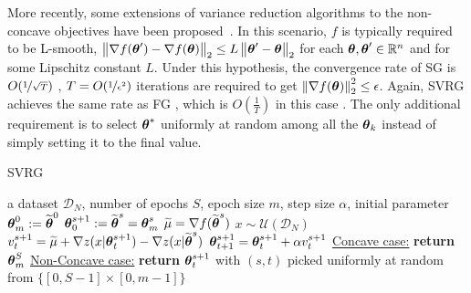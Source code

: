 More recently, some extensions of variance reduction algorithms to the non-concave objectives have been proposed~\citep[\eg][]{allen2016variance,reddi2016stochastic,reddi2016fast}. In this scenario, $f$ is typically required to be L-smooth, \ie $\norm[2]{\nabla f(\vtheta') - \nabla f(\vtheta)} \leq L\norm[2]{\vtheta'-\vtheta}$ for each $\vtheta,\vtheta'\in\realspace^n$ and for some Lipschitz constant $L$. Under this hypothesis, the convergence rate of \acs{SG} is $O(\nicefrac{1}{\sqrt{T}})$ \citep{ghadimi2013stochastic}, \ie $T=O(\nicefrac{1}{\epsilon^2})$ iterations are required to get $\norm[2]{\nabla f(\vtheta)}^2\leq\epsilon$. Again, \acs{SVRG} achieves the same rate as \acs{FG} \citep{reddi2016stochastic}, which is $O(\frac{1}{T})$ in this case \citep{nesterov2013introductory}. The only additional requirement is to select $\vtheta^*$ uniformly at random among all the $\vtheta_k$ instead of simply setting it to the final value.
\begin{algorithm}[tb]
	\caption{SVRG}
	\label{alg:svrg}
	\begin{algorithmic}
		 a dataset $\mathcal{D}_N$, number of epochs $S$, epoch size $m$, step size $\alpha$, initial parameter $\vtheta_{m}^0:=\wt{\vtheta}^0$
		\STATE $\vtheta_0^{s+1} := \wt{\vtheta}^{s} = \vtheta_{m}^s$
		\STATE $\wt{\mu} = \nabla f(\wt{\vtheta}^s)$
		\STATE $x \sim \mathcal{U}\left(\mathcal{D}_N\right)$
		\STATE $v^{s+1}_t = 
		\wt{\mu} + 
		\nabla z(x|\vtheta_t^{s+1}) -
		\nabla z(x|\wt{\vtheta}^{s})
		$
		\STATE $\vtheta_{t+1}^{s+1} = \vtheta_t^{s+1} + \alpha v^{s+1}_t$
		\ENDFOR
		\ENDFOR
		\STATE \underline{Concave case:} \textbf{return} $\vtheta_{m}^S$
		\STATE \underline{Non-Concave case:} \textbf{return} $\vtheta_t^{s+1}$ with $(s,t)$ picked uniformly at random from $\{[0,S-1]\times[0,m-1]\}$
	\end{algorithmic}
\end{algorithm}
